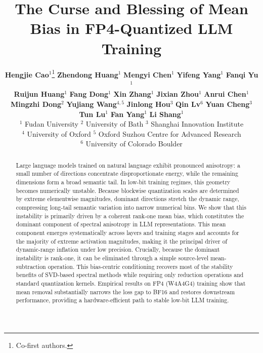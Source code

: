 \documentclass{article}
\title{The Curse and Blessing of Mean Bias in FP4-Quantized LLM Training}
\author{%
\hspace{1.0em} \textbf{Hengjie Cao}$^{1}$\thanks{Co-first authors.} \hspace{1.0em}
\textbf{Zhendong Huang}$^{1}$\footnotemark[1] \hspace{1.0em}
\textbf{Mengyi Chen}$^{1}$ \hspace{1.0em}
\textbf{Yifeng Yang}$^{1}$ \hspace{1.0em}
\textbf{Fanqi Yu}$^{1}$ \\
\hspace{2.0em} \textbf{Ruijun Huang}$^{1}$ \hspace{1.0em}
\textbf{Fang Dong}$^{1}$ \hspace{1.0em}
\textbf{Xin Zhang}$^{1}$ \hspace{1.0em}
\textbf{Jixian Zhou}$^{1}$ \hspace{1.0em}
\textbf{Anrui Chen}$^{1}$ \\
\hspace{1.7em} \textbf{Mingzhi Dong}$^{2}$ \hspace{1.0em}
\textbf{Yujiang Wang}$^{4,5}$ \hspace{1.0em}
\textbf{Jinlong Hou}$^{3}$ \hspace{1.0em}
\textbf{Qin Lv}$^{6}$ \hspace{1.0em}
\textbf{Yuan Cheng}$^{3}$ \\
\hspace{12.0em} \textbf{Tun Lu}$^{1}$ \hspace{1.0em}
\textbf{Fan Yang}$^{1}$ \hspace{1.0em}
\textbf{Li Shang}$^{1}$
\\[0.5em]
\hspace{3.0em} $^1$ Fudan University \hspace{1.0em}
$^2$ University of Bath \hspace{1.0em}
$^3$ Shanghai Innovation Institute \\
\hspace{4.0em} $^4$ University of Oxford \hspace{0.5em}
$^5$ Oxford Suzhou Centre for Advanced Research \hspace{0.5em}  \\
\hspace{13.0em} $^6$ University of Colorado Boulder
}
\begin{document}
\maketitle

\begin{abstract}

Large language models trained on natural language exhibit pronounced anisotropy: a small number of directions concentrate disproportionate energy, while the remaining dimensions form a broad semantic tail. In low-bit training regimes, this geometry becomes numerically unstable. Because blockwise quantization scales are determined by extreme elementwise magnitudes, dominant directions stretch the dynamic range, compressing long-tail semantic variation into narrow numerical bins.
We show that this instability is primarily driven by a coherent rank-one mean bias, which constitutes the dominant component of spectral anisotropy in LLM representations. This mean component emerges systematically across layers and training stages and accounts for the majority of extreme activation magnitudes, making it the principal driver of dynamic-range inflation under low precision.
Crucially, because the dominant instability is rank-one, it can be eliminated through a simple source-level mean-subtraction operation. This bias-centric conditioning recovers most of the stability benefits of SVD-based spectral methods while requiring only reduction operations and standard quantization kernels. Empirical results on FP4 (W4A4G4) training show that mean removal substantially narrows the loss gap to BF16 and restores downstream performance, providing a hardware-efficient path to stable low-bit LLM training.

\end{abstract}
















\newpage




% 

\newpage

\appendix
% 

%
\end{document}
